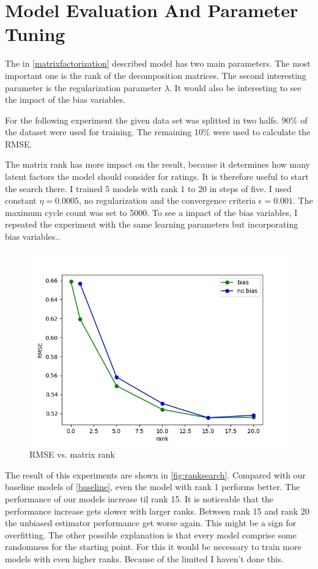 \documentclass[DIV=14,twocolumn]{scrartcl}
\begin{document}
\section{Model Evaluation And Parameter Tuning}\label{parametertuning}
The in \autoref{matrixfactorization} described model has two main parameters. The most important one is the rank of the decomposition matrices. The second interesting parameter is the regularization parameter $\lambda$. It would also be interesting to see the impact of the bias variables.

For the following experiment the given data set was splitted in two halfs. 90\% of the dataset were used for training. The remaining 10\% were used to calculate the RMSE. 

The matrix rank has more impact on the result, because it determines how many latent factors the model should consider for ratings. It is therefore useful to start the search there. I trained 5 models with rank 1 to 20 in steps of five. I used constant $\eta=0.0005$, no regularization and the convergence criteria $\epsilon = 0.001$. The maximum cycle count was set to 5000. To see a impact of the bias variables, I repeated the experiment with the same learning parameters but incorporating bias variables..   
\begin{figure}[h]
	\includegraphics[width=\columnwidth]{../img/rank-rmse-validate}
	\caption{RMSE vs. matrix rank}
	\label{fig:ranksearch}
\end{figure}
The result of this experiments are shown in \autoref{fig:ranksearch}. Compared with our baseline models of \autoref{baseline}, even the model with rank 1 performs better. The performance of our models increase til rank 15. It is noticeable that the performance increase gets slower with larger ranks.
Between rank 15 and rank 20 the unbiased estimator performance get worse again. This might be a sign for overfitting. The other possible explanation is that every model comprise some randomness for the starting point. For this it would be necessary to train more models with even higher ranks. Because of the limited I haven't done this. 
 
\end{document}
